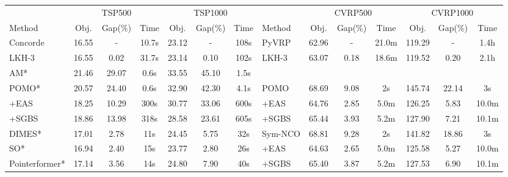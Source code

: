 \begin{tabular}{lcccccclcccccc}
\cmidrule[1.0pt](lr{0.1em}){1-7}
\cmidrule[1.0pt](lr{0.1em}){8-14}
 & \multicolumn{3}{c}{TSP500} & \multicolumn{3}{c}{TSP1000} &
 & \multicolumn{3}{c}{CVRP500} & \multicolumn{3}{c}{CVRP1000} 
\\ 
\cmidrule[0.5pt](lr{0.2em}){2-4}
\cmidrule[0.5pt](lr{0.2em}){5-7}
\cmidrule[0.5pt](lr{0.2em}){9-11}
\cmidrule[0.5pt](lr{0.2em}){12-14}
Method & Obj. & Gap(\%) & Time
 & Obj. & Gap(\%) & Time &
Method & Obj. & Gap(\%) & Time
 & Obj. & Gap(\%) & Time 
\\ 
\cmidrule[1.0pt](lr{0.1em}){1-7}
\cmidrule[1.0pt](lr{0.1em}){8-14}
Concorde & 16.55 & - & 10.7s & 23.12 & - & 108s &
PyVRP & 62.96 & - & 21.0m & 119.29 & - & 1.4h 
\\
LKH-3 & 16.55 & 0.02 & 31.7s & 23.14 & 0.10 & 102s &
LKH-3 & 63.07 & 0.18 & 18.6m & 119.52 & 0.20 & 2.1h
\\
\cmidrule(lr{0.1em}){1-1}
\cmidrule(lr{0.1em}){2-4}
\cmidrule(lr{0.1em}){5-7}
\cmidrule(lr{0.1em}){8-8}
\cmidrule(lr{0.1em}){9-11}
\cmidrule(lr{0.1em}){12-14}
AM{*} & 21.46 & 29.07 & 0.6s & 33.55 & 45.10 & 1.5s 
\\
POMO{*} & 20.57 & 24.40 & 0.6s & 32.90 & 42.30 & 4.1s &
POMO & 68.69 & 9.08 & 2s & 145.74 & 22.14 & 3s
\\
\qquad+EAS & 18.25 & 10.29 & 300s & 30.77 & 33.06 & 600s & 
\qquad+EAS & 64.76 & 2.85 & 5.0m & 126.25 & 5.83 & 10.0m
\\
\qquad+SGBS & 18.86 & 13.98 & 318s & 28.58 & 23.61 & 605s &
\qquad+SGBS & 65.44 & 3.93 & 5.2m & 127.90 & 7.21 & 10.1m  
\\
DIMES{*} & 17.01 & 2.78 & 11s & 24.45 & 5.75 & 32s &
Sym-NCO  & 68.81 & 9.28 & 2s & 141.82 & 18.86 & 3s 
\\
SO{*} & 16.94 & 2.40 & 15s & 23.77 & 2.80 & 26s &
\qquad+EAS & 64.63 & 2.65 & 5.0m & 125.58 & 5.27 & 10.0m 
\\
Pointerformer{*} & 17.14 & 3.56 & 14s & 24.80 & 7.90 & 40s &
\qquad+SGBS  & 65.40 & 3.87 & 5.2m & 127.53 & 6.90 & 10.1m 
\\
\cmidrule(lr{0.1em}){1-1}
\cmidrule(lr{0.1em}){2-4}
\cmidrule(lr{0.1em}){5-7}
\cmidrule(lr{0.1em}){8-8}
\cmidrule(lr{0.1em}){9-11}

\end{tabular}
